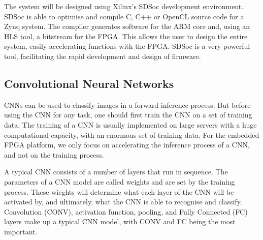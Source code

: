 \documentclass[12pt]{article}
\begin{document}
The system will be designed using Xilinx's SDSoc development environment. SDSoc is able to optimise and compile C, C++ or OpenCL source code for a Zynq system. The compiler generates software for the ARM core and, using an HLS tool, a bitstream for the FPGA. This allows the user to design the entire system, easily accelerating functions with the FPGA. SDSoc is a very powerful tool, facilitating the rapid development and design of firmware.

\subsection{Convolutional Neural Networks}
\label{sec:Background-CNN}

CNNs can be used to classify images in a forward inference process. But before using the CNN for any task, one should first train the CNN on a set of training data. The training of a CNN is usually implemented on large servers with a huge computational capacity, with an enormous set of training data. For the embedded FPGA platform, we only focus on accelerating the inference process of a CNN, and not on the training process.

A typical CNN consists of a number of layers that run in sequence. The parameters of a CNN model are called weights and are set by the training process. These wieghts will determine what each layer of the CNN will be activated by, and ultimately, what the CNN is able to recognise and classify. Convolution (CONV), activation function, pooling, and Fully Connected (FC) layers make up a typical CNN model, with CONV and FC being the most important.
\end{document}
